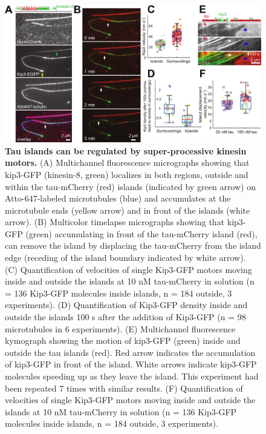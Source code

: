 \begin{figure}[h!]
\centering
\includegraphics[width=1\linewidth]{Figures/taukip3.png}
\caption[Tau islands can be regulated by super-processive kinesin motors.]{
\textbf{Tau islands can be regulated by super-processive kinesin motors.} (A) Multichannel fluorescence micrographs showing that kip3-GFP (kinesin-8, green) localizes in both regions, outside and within the tau-mCherry (red) islands (indicated by green arrow) on Atto-647-labeled microtubules (blue) and accumulates at the microtubule ends (yellow arrow) and in front of the islands (white arrow). (B) Multicolor timelapse micrographs showing that kip3-GFP (green) accumulating in front of the tau-mCherry island (red), can remove the island by displacing the tau-mCherry from the island edge (receding of the island boundary indicated by white arrow). (C) Quantification of velocities of single Kip3-GFP motors moving inside and outside the islands at 10 nM tau-mCherry in solution (n = 136 Kip3-GFP molecules inside islands, n = 184 outside, 3 experiments). (D) Quantification of Kip3-GFP density inside and outside the islands 100 s after the addition of Kip3-GFP (n = 98 microtubules in 6 experiments). (E) Multichannel fluorescence kymograph showing the motion of kip3-GFP (green) inside and outside the tau islands (red). Red arrow indicates the accumulation of kip3-GFP in front of the island. White arrows indicate kip3-GFP molecules speeding up as they leave the island. This experiment had been repeated 7 times with similar results. (F) Quantification of velocities of single Kip3-GFP motors moving inside and outside the islands at 10 nM tau-mCherry in solution (n = 136 Kip3-GFP molecules inside islands, n = 184 outside, 3 experiments).
	}\label{taukip3}
\end{figure}
